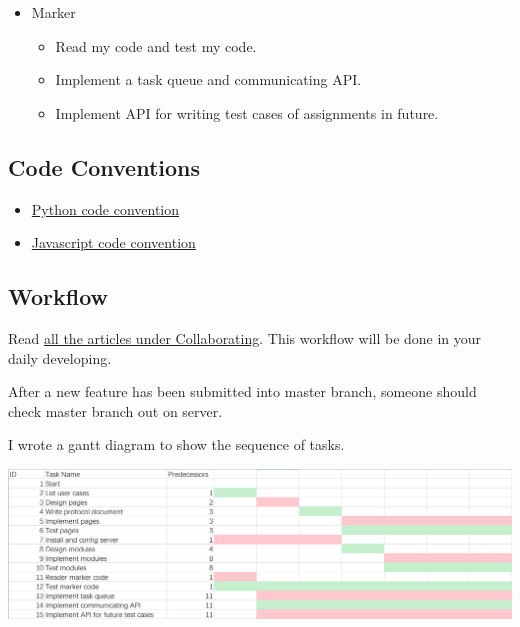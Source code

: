 \documentclass[12pt,a4paper]{article}
\begin{document}
\begin{itemize}
	\item Marker
	\begin{itemize}
		\item Read my code and test my code. 
		\item Implement a task queue and communicating API.
		\item Implement API for writing test cases of assignments in future.
	\end{itemize}
\end{itemize}

\subsection{Code Conventions}
\begin{itemize}
	\item \href{https://google.github.io/styleguide/pyguide.html}{Python code convention}
	\item \href{https://google.github.io/styleguide/javascriptguide.xml}{Javascript code convention}
\end{itemize}

\subsection{Workflow}
Read \href{https://www.atlassian.com/git/tutorials/syncing}{all the articles under Collaborating}. This workflow will be done in your daily developing. 

After a new feature has been submitted into master branch, someone should check master branch out on server. 

I wrote a gantt diagram to show the sequence of tasks.

\centering
\includegraphics[scale=0.3]{gantt-diagram.png}
\end{document}
